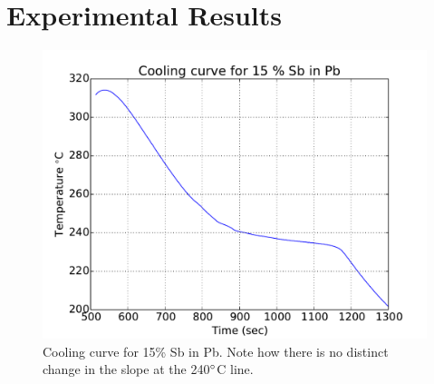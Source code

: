 \documentclass{article}
\begin{document}
\section{Experimental Results}
\begin{figure}[H]
\centering
\includegraphics[width=350pt]{graphs/graph1.pdf}
\caption{Cooling curve for 15\% Sb in Pb. Note how there is no distinct change in the slope at the 240$\degree$C line.}
\label{fig:cc}
\end{figure}
\end{document}
